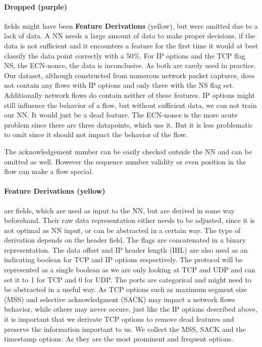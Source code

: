 \documentclass[
	ngerman,
	ruledheaders=section,%
	class=report,%
	thesis={type=bachelor},%
	accentcolor=9c,%
	custommargins=true,%
	marginpar=false,%
	parskip=half-,%
	fontsize=11pt,%
]{tudapub}
\begin{document}
\paragraph{\colorbox{dropped}{\textbf{Dropped} (purple)}} fields might have been \colorbox{derivation}{\textbf{Feature Derivations} (yellow)}, but were omitted due to a lack of data.
A NN needs a large amount of data to make proper decisions, if the data is not sufficient and it encounters a feature for the first time it would at best classify the data point correctly with a 50\%.
For IP options and the TCP flag NS, the ECN-nonce, the data is inconclusive.
As both are rarely used in practice.
Our dataset, although constructed from numerous network packet captures, does not contain any flows with IP options and only three with the NS flag set.
Additionally network flows do contain neither of these features.
IP options might still influence the behavior of a flow, but without sufficient data, we can not train our NN.
It would just be a dead feature.
The ECN-nonce is the more acute problem since there are three datapoints, which use it.
But it is less problematic to omit since it should not impact the behavior of the flow.

The acknowledgement number can be easily checked outside the NN and can be omitted as well.
However the sequence number validity or even position in the flow can make a flow special.

\paragraph{\colorbox{derivation}{\textbf{Feature Derivations} (yellow)}} are fields, which are used as input to the NN,
but are derived in some way beforehand.
Their raw data representation either needs to be adjusted, since it is not optimal as NN input, or can be abstracted in a certain way.
The type of derivation depends on the header field.
The flags are concatenated in a binary representation.
The data offset and IP header length (IHL) are also used as an indicating boolean for TCP and IP options respectively.
The protocol will be represented as a single boolean as we are only looking at TCP and UDP and can set it to 1 for TCP and 0 for UDP.
The ports are categorical and might need to be abstracted in a useful way.
As TCP options such as maximum segment size (MSS) and selective acknowledgment (SACK) may impact a network flows behavior,
while others may never occure, just like the IP options described above,
it is important that we derivate TCP options to remove dead features and preserve the information important to us.
We collect the MSS, SACK and the timestamp options.
As they are the most prominent and frequent options.
\end{document}
